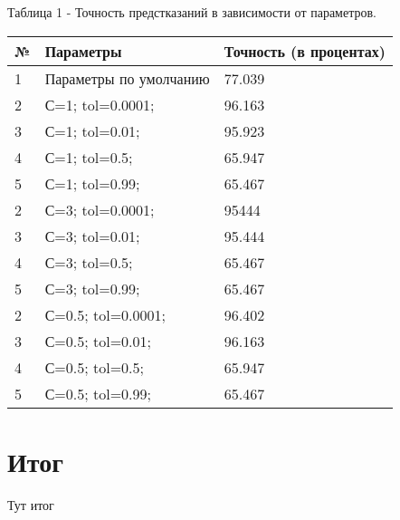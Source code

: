 \documentclass[a4paper,12pt]{article}
\begin{document}
	\vspace{0.5cm}
	Таблица 1 - Точность предстказаний в зависимости от параметров.
\begin{longtable}{|p{1cm}|p{9cm}|p{3cm}|}
\hline 
№ & Параметры & Точность (в процентах) \\ 
\hline 
1 & Параметры по умолчанию & 77.039 \\
\hline
2 & С=1; tol=0.0001; & 96.163 \\
\hline 
3 & С=1; tol=0.01; & 95.923 \\
\hline 
4 &  С=1; tol=0.5;  & 65.947 \\
\hline 
5 & С=1; tol=0.99;  & 65.467 \\
\hline
2 & С=3; tol=0.0001; & 95444 \\
\hline 
3 & С=3; tol=0.01; & 95.444 \\
\hline 
4 &  С=3; tol=0.5;  & 65.467 \\
\hline 
5 & С=3; tol=0.99;  & 65.467 \\
\hline
2 & С=0.5; tol=0.0001; & 96.402 \\
\hline 
3 & С=0.5; tol=0.01; & 96.163 \\
\hline 
4 & С=0.5; tol=0.5;  & 65.947 \\
\hline 
5 & С=0.5; tol=0.99;  & 65.467 \\
\hline 
\end{longtable}


\newpage\section{Итог}
	Тут итог
	
	
\end{document}
